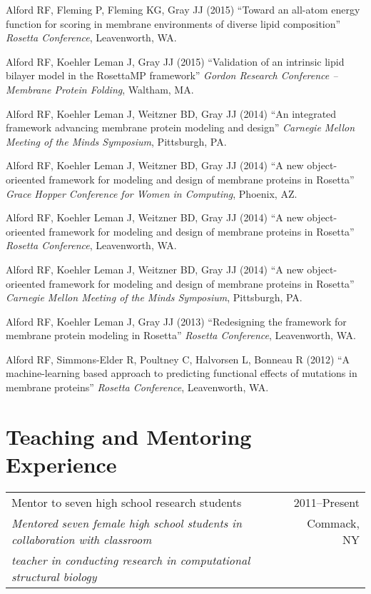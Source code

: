 \documentclass[12pt]{article}
\makeatletter
\newcommand{\allcapsspacing}[1]{{\addfontfeature{LetterSpace=7.5}#1}}
\newcommand{\threerowstwocolsitem}[5]{
\noindent
\begin{tabular*}{\textwidth}{@{\extracolsep{\fill}}lr}
		#1 & #2 \\
		#3 & #4 \\
		#5 & \\
\end{tabular*}\vspace{0.75\baselineskip}}
\newcommand{\longteachingitem}[5]{
\threerowstwocolsitem{#1}{#2}{\textit{#3}}{#5}{\textit{#4}}}
\makeatother
\begin{document}
\begin{etaremune}
\item Alford RF, Fleming P, Fleming KG, Gray JJ (2015) ``Toward an all-atom energy function for scoring in membrane environments of diverse lipid composition'' \textit{Rosetta Conference}, Leavenworth, WA.
\item Alford RF, Koehler Leman J, Gray JJ (2015) ``Validation of an intrinsic lipid bilayer model in the RosettaMP framework'' \textit{Gordon Research Conference -- Membrane Protein Folding}, Waltham, MA.
\item Alford RF, Koehler Leman J, Weitzner BD, Gray JJ (2014) ``An integrated framework advancing membrane protein modeling and design'' \textit{Carnegie Mellon Meeting of the Minds Symposium}, Pittsburgh, PA.
\item Alford RF, Koehler Leman J, Weitzner BD, Gray JJ (2014) ``A new object-orieented framework for modeling and design of membrane proteins in Rosetta'' \textit{Grace Hopper Conference for Women in Computing}, Phoenix, AZ.
\item Alford RF, Koehler Leman J, Weitzner BD, Gray JJ (2014) ``A new object-orieented framework for modeling and design of membrane proteins in Rosetta'' \textit{Rosetta Conference}, Leavenworth, WA.
\item Alford RF, Koehler Leman J, Weitzner BD, Gray JJ (2014) ``A new object-orieented framework for modeling and design of membrane proteins in Rosetta'' \textit{Carnegie Mellon Meeting of the Minds Symposium}, Pittsburgh, PA.
\item Alford RF, Koehler Leman J, Gray JJ (2013) ``Redesigning the framework for membrane protein modeling in Rosetta'' \textit{Rosetta Conference}, Leavenworth, WA.
\item Alford RF, Simmons-Elder R, Poultney C, Halvorsen L, Bonneau R (2012) ``A machine-learning based approach to predicting functional effects of mutations in membrane proteins'' \textit{Rosetta Conference}, Leavenworth, WA.
\end{etaremune}

\section*{\allcapsspacing{Teaching and Mentoring Experience}}

\longteachingitem{Mentor to seven high school research students}{2011--Present}{Mentored seven female high school students in collaboration with classroom}{teacher in conducting research in computational structural biology}{Commack, NY}
\end{document}
